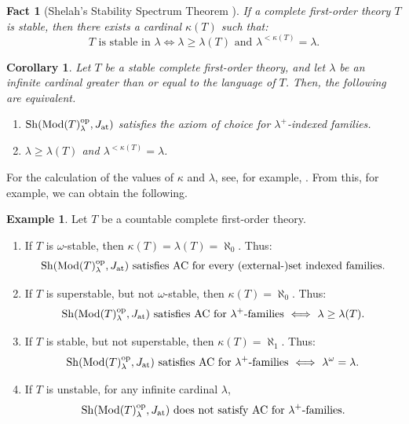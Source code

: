 \documentclass[10pt]{amsart}
\numberwithin{equation}{section}
\theoremstyle{plain}
\newtheorem{cor}[theorem]{Corollary}
\newtheorem{fact}{Fact}
\theoremstyle{definition}
\newtheorem{example}[theorem]{Example}
\newcommand{\om}{\omega}
\begin{document}
\begin{fact}[Shelah's Stability Spectrum Theorem {\cite[Theorem III.5.15]{She90}}]
If a complete first-order theory $T$ is stable, then there exists a cardinal $\kappa(T)$ such that:
\[
\text{$T$ is stable in $\lambda$}
\iff 
\text{$\lambda\geq\lambda(T)$ and $\lambda^{<\kappa(T)}=\lambda$}.
\]
\end{fact}

\begin{cor}
Let $T$ be a stable complete first-order theory, and let $\lambda$ be an infinite cardinal greater than or equal to the language of $T$.
Then, the following are equivalent.
\begin{enumerate}
\item ${\rm Sh}({\rm Mod}(T)_\lambda^{\rm op},J_{\rm at})$ satisfies the axiom of choice for $\lambda^+$-indexed families.
\item $\lambda\geq\lambda(T)$ and $\lambda^{<\kappa(T)}=\lambda$.
\end{enumerate}
\end{cor}

For the calculation of the values of $\kappa$ and $\lambda$, see, for example, \cite[Theorem 8.6.5]{TeZi12}.
From this, for example, we can obtain the following.

\begin{example}\label{exa:stable-spectra}
Let $T$ be a countable complete first-order theory.
\begin{enumerate}
\item If $T$ is $\om$-stable, then $\kappa(T)=\lambda(T)=\aleph_0$.
Thus:
\[\text{${\rm Sh}({\rm Mod}(T)_\lambda^{\rm op},J_{\rm at})$ satisfies AC for every (external-)set indexed families.}\]
\item If $T$ is superstable, but not $\om$-stable, then $\kappa(T)=\aleph_0$.
Thus: 
\[\text{${\rm Sh}({\rm Mod}(T)_\lambda^{\rm op},J_{\rm at})$ satisfies AC for $\lambda^+$-families $\iff$ $\lambda\geq\lambda(T)$}.\]
\item If $T$ is stable, but not superstable, then $\kappa(T)=\aleph_1$.
Thus:
\[\text{${\rm Sh}({\rm Mod}(T)_\lambda^{\rm op},J_{\rm at})$ satisfies AC for $\lambda^+$-families $\iff$ $\lambda^\om=\lambda$.}\]
\item If $T$ is unstable, for any infinite cardinal $\lambda$,
\[\text{${\rm Sh}({\rm Mod}(T)_\lambda^{\rm op},J_{\rm at})$ does not satisfy AC for $\lambda^+$-families}.\]
\end{enumerate}
\end{example}
\end{document}
